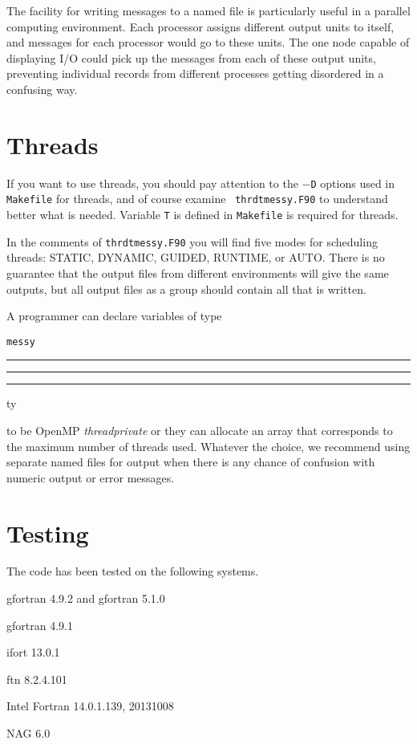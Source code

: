 \documentclass[12pt]{article}
\DeclareRobustCommand{\us}{\rule{.2pt}{0pt}\rule[-.8pt]{.4em}{.5pt}%
  \rule{.2pt}{0pt}}
\DeclareRobustCommand{\us}{\rule{.2pt}{0pt}\rule[-.8pt]{.4em}{.5pt}%
  \rule{.2pt}{0pt}}
\begin{document}
The facility for writing messages to a named file is particularly useful in a
parallel computing environment.  Each processor assigns different output units
to itself, and messages for each processor would go to these units. The one node
capable of displaying I/O could pick up the messages from each of these output
units, preventing individual records from different processes getting disordered
in a confusing way.

\section{Threads}
\label{sec:threads}

If you want to use threads, you should pay attention to the {\tt $-$D} options
used in {\tt Makefile} for threads, and of course examine {\tt
  thrdtmessy.F90} to understand better what is needed.  Variable {\tt T} is
defined in {\tt Makefile} is required for threads.

In the comments of {\tt thrdtmessy.F90} you will find five modes for scheduling
threads: STATIC, DYNAMIC, GUIDED, RUNTIME, or AUTO.  There is no guarantee that
the output files from different environments will give the same outputs, but all
output files as a group should contain all that is written.

A programmer can declare variables of type {\tt messy\us ty} to be
OpenMP {\em threadprivate} or they can allocate an array that corresponds to
the maximum number of threads used.  Whatever the choice, we 
recommend using separate named files for output when there is
any chance of confusion with numeric output or error messages.

\section{Testing}
\label{sec:testing}

The code has been tested on the following systems.
\begin{description}\setlength{\itemsep}{-2pt}
\item[Gentoo Linux:] gfortran  4.9.2 and gfortran 5.1.0
\item[Ubuntu Linux:] gfortran 4.9.1
\item[Red Hat Enterprise Linux:] ifort 13.0.1
\item[Cray CCE:] ftn  8.2.4.101
\item[Windows 7:] Intel Fortran 14.0.1.139, 20131008
\item[Ubuntu Linux:] NAG 6.0
\end{description}
\end{document}
